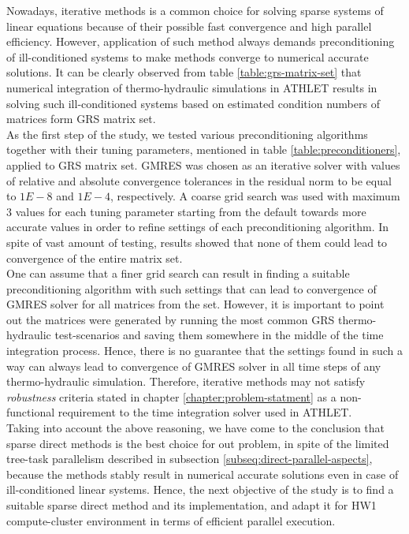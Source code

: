 \label{subseq:hybrid-method-description}


Nowadays, iterative methods is a common choice for solving sparse systems of linear equations because of their possible fast convergence and high parallel efficiency. However, application of such method always demands preconditioning of ill-conditioned systems to make methods converge to numerical accurate solutions. It can be clearly observed from table \ref{table:grs-matrix-set} that numerical integration of thermo-hydraulic simulations in ATHLET results in solving such ill-conditioned systems  based on estimated condition numbers of matrices form GRS matrix set.\\


As the first step of the study, we tested various preconditioning algorithms together with their tuning parameters, mentioned in table \ref{table:preconditioners}, applied to GRS matrix set. GMRES was chosen as an iterative solver with values of relative and absolute convergence tolerances in the residual norm to be equal to $1E-8$ and $1E-4$, respectively. A coarse grid search was used with maximum 3 values for each tuning parameter starting from the default towards more accurate values in order to refine settings of each preconditioning algorithm. In spite of vast amount of testing, results showed that none of them could lead to convergence of the entire matrix set.\\


One can assume that a finer grid search can result in finding a suitable preconditioning algorithm with such settings that can lead to convergence of GMRES solver for all matrices from the set. However, it is important to point out the matrices were generated by running the most common GRS thermo-hydraulic test-scenarios and saving them somewhere in the middle of the time integration process. Hence, there is no guarantee that the settings found in such a way can always lead to convergence of GMRES solver in all time steps of any thermo-hydraulic simulation. Therefore, iterative methods may not satisfy \textit{robustness} criteria stated in chapter \ref{chapter:problem-statment} as a non-functional requirement to the time integration solver used in ATHLET.\\


Taking into account the above reasoning, we have come to the conclusion that sparse direct methods is the best choice for out problem, in spite of the limited tree-task parallelism described in subsection \ref{subseq:direct-parallel-aspects}, because the methods stably result in numerical accurate solutions even in case of ill-conditioned linear systems. Hence, the next objective of the study is to find a suitable sparse direct method and its implementation, and adapt it for HW1 compute-cluster environment in terms of efficient parallel execution. \\



